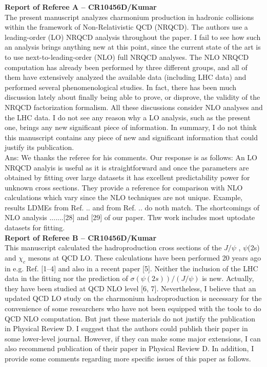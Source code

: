 \documentclass[aps,prc,preprint,superscriptaddress,showpacs,showkeys,amsmath]{revtex4-1}
\begin{document}
{\bf Report of Referee A -- CR10456D/Kumar } \\


The present manuscript analyzes charmonium production in hadronic collisions
within the framework of Non-Relativistic QCD (NRQCD). The authors use a
leading-order (LO) NRQCD analysis throughout the paper. I fail to see how such
an analysis brings anything new at this point, since the current state of the
art is to use next-to-leading-order (NLO) full NRQCD analyses. The NLO NRQCD
computation has already been performed by three different groups, and all of
them have extensively analyzed the available data (including LHC data) and
performed several phenomenological studies. In fact, there has been much
discussion lately about finally being able to prove, or disprove, the validity
of the NRQCD factorization formalism. All these discussions consider NLO
analyses and the LHC data. I do not see any reason why a LO analysis, such as
the present one, brings any new significant piece of information. In summary, I
do not think this manuscript contains any piece of new and significant
information that could justify its publication.\\
{\color{blue}
Ans: We thanks the referee for his comments. Our response is as follows:
 An LO NRQCD analyis is useful as it is straightforward and once
the parameters are obtained by fitting over large datasets it has excellent 
predictability power for unknown cross sections. They provide a reference
for comparison with NLO calculations which vary since the NLO techniques are
not unique. Example, results LDMEs from Ref. .. and from Ref. .. do noth 
match.
 The shortcomings of NLO analysis .......[28] and [29] of our paper.
 Thw work includes most uptodate datasets for fitting.
}
 \\

{\bf Report of Referee B -- CR10456D/Kumar} \\


This manuscript calculated the hadroproduction cross sections of the 
$J/\psi$ ,  $\psi$(2s) and $\chi_c$ mesons at QCD LO. These calculations have been 
performed 20 years ago in e.g. Ref. [1–4] and also in a recent paper [5]. Neither 
the inclusion of the LHC data in the fitting nor the prediction of 
$\sigma(\psi(2s))/(J/\psi)$ is new.  Actually, they have been studied at QCD NLO
level [6, 7]. Nevertheless, I believe that an updated QCD LO study on the charmonium
hadroproduction is necessary for the convenience of some researchers who have not been
equipped with the tools to do QCD NLO computation. But just these materials do not
justify the publication in Physical Review D. I suggest that the authors could publish 
their paper in some lower-level journal. However, if they can make some major 
extensions, I can also recommend publication of their paper in Physical Review D.
 In addition, I provide some comments regarding more specific issues of this paper 
as follows.
\end{document}
